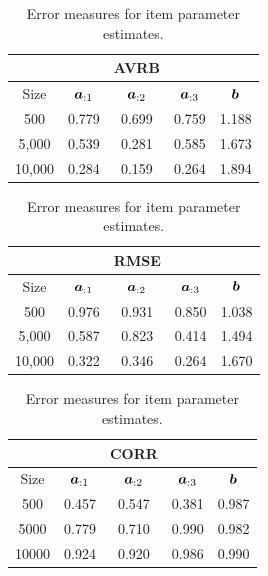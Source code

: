 \begin{table}[h]
\begin{center}
  \begin{tabular}{ccccc}
    \hline
    &&AVRB&&\\
    \hline
    Size  & $\boldsymbol{a}_{:1}$ & $\boldsymbol{a}_{:2}$ & $\boldsymbol{a}_{:3}$ & $\boldsymbol{b}$ \\
    \hline
    500   & 0.779 & 0.699 & 0.759 & 1.188 \\
    5,000 & 0.539 & 0.281 & 0.585 & 1.673 \\
    10,000  &0.284  & 0.159 & 0.264 & 1.894 \\
    \hline
  \end{tabular}
\end{center}

\begin{center}
  \begin{tabular}{ccccc}
    \hline
    &&RMSE&&\\
    \hline
    Size  & $\boldsymbol{a}_{:1}$ & $\boldsymbol{a}_{:2}$ & $\boldsymbol{a}_{:3}$ & $\boldsymbol{b}$ \\
    \hline
    500   & 0.976 & 0.931 & 0.850 & 1.038 \\
    5,000 & 0.587 & 0.823 & 0.414 & 1.494 \\
    10,000  & 0.322 & 0.346 & 0.264 & 1.670 \\
    \hline
  \end{tabular}
\end{center}

\begin{center}
  \begin{tabular}{ccccc}
    \hline
    &&CORR&&\\
    \hline
    Size  & $\boldsymbol{a}_{:1}$ & $\boldsymbol{a}_{:2}$ & $\boldsymbol{a}_{:3}$ & $\boldsymbol{b}$ \\
    \hline
    500   & 0.457 & 0.547 & 0.381 & 0.987 \\
    5000  & 0.779 & 0.710 & 0.990 & 0.982 \\
    10000   & 0.924 & 0.920 & 0.986 & 0.990 \\
    \hline
  \end{tabular}
\end{center}
\caption{Error measures for item parameter estimates.}
\label{tab:ijcnn_param}
\end{table}

